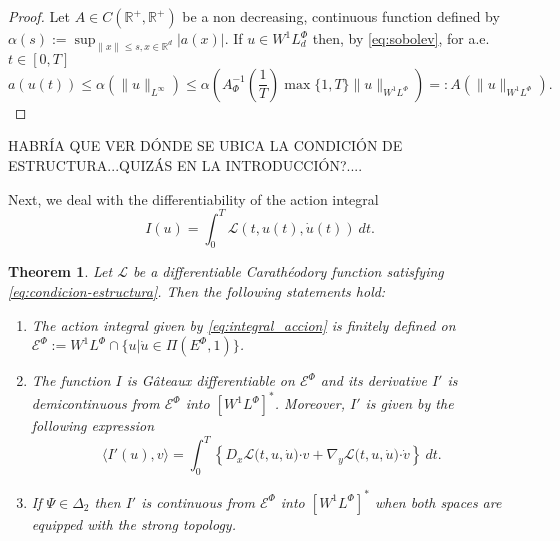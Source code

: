\documentclass[twoside]{article}
\newtheorem{thm}{Theorem}[section]
\theoremstyle{remark}
\newcommand{\lphi}{L^{\Phi}}
\newcommand{\ephi}{E^{\Phi}}
\newcommand{\wphi}{W^{1}\lphi}
\newcommand{\sobnor}{\|_{W^{1}\lphi}}
\newcommand{\domi}{\mathcal{E}^{\Phi}}
\renewcommand{\b}[1]{\boldsymbol{#1}}
\newcommand{\rr}{\mathbb{R}}
\newcommand{\ccdot}{\b{\cdot}}
\renewcommand{\leq}{\leqslant}
\begin{document}
\begin{proof}  Let $A \in C(\mathbb{R}^+,\mathbb{R}^+)$ be a  non decreasing, continuous function defined by  
$\alpha(s):=\sup_{\|x\|\leq s, x \in \rr^d}|a(x)|$.  If $u \in \wphi_d$ then, by  \ref{eq:sobolev}, for a.e. $t\in [0,T]$
\[a(u(t))\leq \alpha (\|u\|_{L^{\infty}})\leq 
\alpha \left(
A_\Phi^{-1}\left(\frac{1}{T}\right)\max\{1,T\}\|u\sobnor\right)=: 
A(\|u\sobnor).\]
\end{proof}



HABR\'IA QUE VER D\'ONDE SE UBICA LA CONDICI\'ON DE ESTRUCTURA...QUIZ\'AS EN LA INTRODUCCI\'ON?....


Next, we deal with the differentiability of the action integral 
\begin{equation}\label{eq:integral_accion}
I(u)=\int_{0}^T \mathcal{L}(t,u(t),\dot{u}(t))\ dt.
\end{equation}

\begin{thm}\label{teo:diferenciabilidad}
Let $\mathcal{L}$ be a differentiable Carath\'eodory function satisfying \eqref{eq:condicion-estructura}.
Then the following statements hold:
\begin{enumerate}
\item \label{it:T1item1} \label{A1} The action integral given by \eqref{eq:integral_accion}
is finitely defined on $\domi:=W^{1}\lphi\cap\{u|\dot{u}\in\Pi(\ephi,1)\}$.

\item\label{it:T1item3} The function  $I$ is G\^ateaux differentiable on $\domi$ and  its derivative $I'$ is demicontinuous from 
$\domi$  into $\left[\wphi \right]^*$. Moreover, $I'$ is given by the following expression
\begin{equation}\label{eq:DerAccion}
\langle  I'(u),v\rangle= \int_0^T \left\{D_{x}\mathcal{L}\big(t,u,\dot{u}\big)\ccdot v
+ \nabla_y\mathcal{L}\big(t,u,\dot{u}\big)\ccdot\dot{v}\right\} \ dt.
\end{equation}

\item\label{it:T1item4}  If  $\Psi \in \Delta_2$ then 
  $I'$ is continuous from $\domi$ into $\left[\wphi\right]^*$ when both spaces are equipped with the strong topology.
\end{enumerate}
\end{thm}
\end{document}

